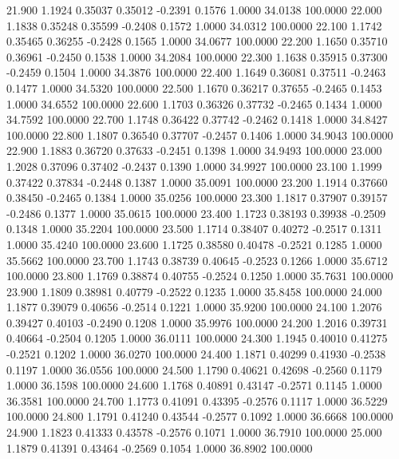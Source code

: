   21.900   1.1924   0.35037   0.35012  -0.2391   0.1576   1.0000  34.0138 100.0000
  22.000   1.1838   0.35248   0.35599  -0.2408   0.1572   1.0000  34.0312 100.0000
  22.100   1.1742   0.35465   0.36255  -0.2428   0.1565   1.0000  34.0677 100.0000
  22.200   1.1650   0.35710   0.36961  -0.2450   0.1538   1.0000  34.2084 100.0000
  22.300   1.1638   0.35915   0.37300  -0.2459   0.1504   1.0000  34.3876 100.0000
  22.400   1.1649   0.36081   0.37511  -0.2463   0.1477   1.0000  34.5320 100.0000
  22.500   1.1670   0.36217   0.37655  -0.2465   0.1453   1.0000  34.6552 100.0000
  22.600   1.1703   0.36326   0.37732  -0.2465   0.1434   1.0000  34.7592 100.0000
  22.700   1.1748   0.36422   0.37742  -0.2462   0.1418   1.0000  34.8427 100.0000
  22.800   1.1807   0.36540   0.37707  -0.2457   0.1406   1.0000  34.9043 100.0000
  22.900   1.1883   0.36720   0.37633  -0.2451   0.1398   1.0000  34.9493 100.0000
  23.000   1.2028   0.37096   0.37402  -0.2437   0.1390   1.0000  34.9927 100.0000
  23.100   1.1999   0.37422   0.37834  -0.2448   0.1387   1.0000  35.0091 100.0000
  23.200   1.1914   0.37660   0.38450  -0.2465   0.1384   1.0000  35.0256 100.0000
  23.300   1.1817   0.37907   0.39157  -0.2486   0.1377   1.0000  35.0615 100.0000
  23.400   1.1723   0.38193   0.39938  -0.2509   0.1348   1.0000  35.2204 100.0000
  23.500   1.1714   0.38407   0.40272  -0.2517   0.1311   1.0000  35.4240 100.0000
  23.600   1.1725   0.38580   0.40478  -0.2521   0.1285   1.0000  35.5662 100.0000
  23.700   1.1743   0.38739   0.40645  -0.2523   0.1266   1.0000  35.6712 100.0000
  23.800   1.1769   0.38874   0.40755  -0.2524   0.1250   1.0000  35.7631 100.0000
  23.900   1.1809   0.38981   0.40779  -0.2522   0.1235   1.0000  35.8458 100.0000
  24.000   1.1877   0.39079   0.40656  -0.2514   0.1221   1.0000  35.9200 100.0000
  24.100   1.2076   0.39427   0.40103  -0.2490   0.1208   1.0000  35.9976 100.0000
  24.200   1.2016   0.39731   0.40664  -0.2504   0.1205   1.0000  36.0111 100.0000
  24.300   1.1945   0.40010   0.41275  -0.2521   0.1202   1.0000  36.0270 100.0000
  24.400   1.1871   0.40299   0.41930  -0.2538   0.1197   1.0000  36.0556 100.0000
  24.500   1.1790   0.40621   0.42698  -0.2560   0.1179   1.0000  36.1598 100.0000
  24.600   1.1768   0.40891   0.43147  -0.2571   0.1145   1.0000  36.3581 100.0000
  24.700   1.1773   0.41091   0.43395  -0.2576   0.1117   1.0000  36.5229 100.0000
  24.800   1.1791   0.41240   0.43544  -0.2577   0.1092   1.0000  36.6668 100.0000
  24.900   1.1823   0.41333   0.43578  -0.2576   0.1071   1.0000  36.7910 100.0000
  25.000   1.1879   0.41391   0.43464  -0.2569   0.1054   1.0000  36.8902 100.0000
